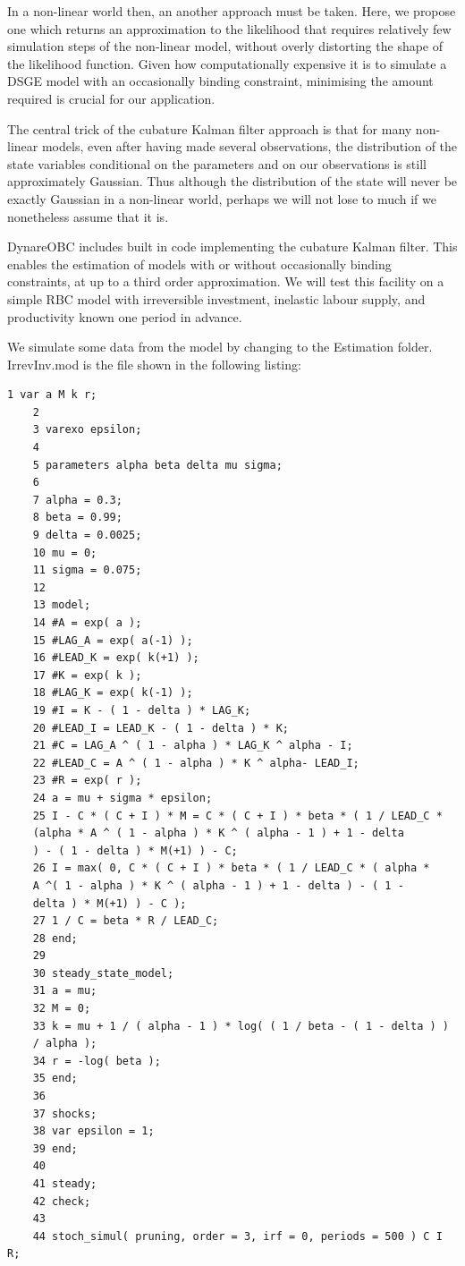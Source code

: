 \documentclass[cn,10pt,math=newtx,citestyle=gb7714-2015,bibstyle=gb7714-2015]{elegantbook}
\begin{document}
In a non-linear world then, an another approach must be taken. Here, we propose one which returns an approximation to the likelihood that requires relatively few simulation steps of the non-linear model, without overly distorting the shape of the likelihood function. Given how computationally expensive
it is to simulate a DSGE model with an occasionally binding constraint, minimising the amount required is crucial for our application.

The central trick of the cubature Kalman filter approach is that for many non-linear models, even after having made several observations, the distribution of the state variables conditional on the parameters and on our observations is still approximately Gaussian. Thus although the distribution of the
state will never be exactly Gaussian in a non-linear world, perhaps we will not lose to much if we nonetheless assume that it is.

DynareOBC includes built in code implementing the cubature Kalman filter. This enables the estimation of models with or without occasionally binding constraints, at up to a third order approximation. We will test this facility on a simple RBC model with irreversible investment, inelastic labour supply, and productivity known one period in advance.

We simulate some data from the model by changing to the Estimation folder. IrrevInv.mod is the file shown in the following listing:

\begin{lstlisting}[frame=shadowbox]
	1 var a M k r;
	2 
	3 varexo epsilon;
	4 
	5 parameters alpha beta delta mu sigma;
	6
	7 alpha = 0.3;
	8 beta = 0.99;
	9 delta = 0.0025;
	10 mu = 0;
	11 sigma = 0.075;
	12
	13 model;
	14 #A = exp( a );
	15 #LAG_A = exp( a(-1) );
	16 #LEAD_K = exp( k(+1) );
	17 #K = exp( k );
	18 #LAG_K = exp( k(-1) );
	19 #I = K - ( 1 - delta ) * LAG_K;
	20 #LEAD_I = LEAD_K - ( 1 - delta ) * K;
	21 #C = LAG_A ^ ( 1 - alpha ) * LAG_K ^ alpha - I;
	22 #LEAD_C = A ^ ( 1 - alpha ) * K ^ alpha- LEAD_I;
	23 #R = exp( r );
	24 a = mu + sigma * epsilon;
	25 I - C * ( C + I ) * M = C * ( C + I ) * beta * ( 1 / LEAD_C * 
	(alpha * A ^ ( 1 - alpha ) * K ^ ( alpha - 1 ) + 1 - delta
	) - ( 1 - delta ) * M(+1) ) - C;
	26 I = max( 0, C * ( C + I ) * beta * ( 1 / LEAD_C * ( alpha *
	A ^( 1 - alpha ) * K ^ ( alpha - 1 ) + 1 - delta ) - ( 1 -
	delta ) * M(+1) ) - C );
	27 1 / C = beta * R / LEAD_C;
	28 end;
	29
	30 steady_state_model;
	31 a = mu;
	32 M = 0;
	33 k = mu + 1 / ( alpha - 1 ) * log( ( 1 / beta - ( 1 - delta ) )
	/ alpha );
	34 r = -log( beta );
	35 end;
	36
	37 shocks;
	38 var epsilon = 1;
	39 end;
	40
	41 steady;
	42 check;
	43
	44 stoch_simul( pruning, order = 3, irf = 0, periods = 500 ) C I R;
\end{lstlisting}
\end{document}
